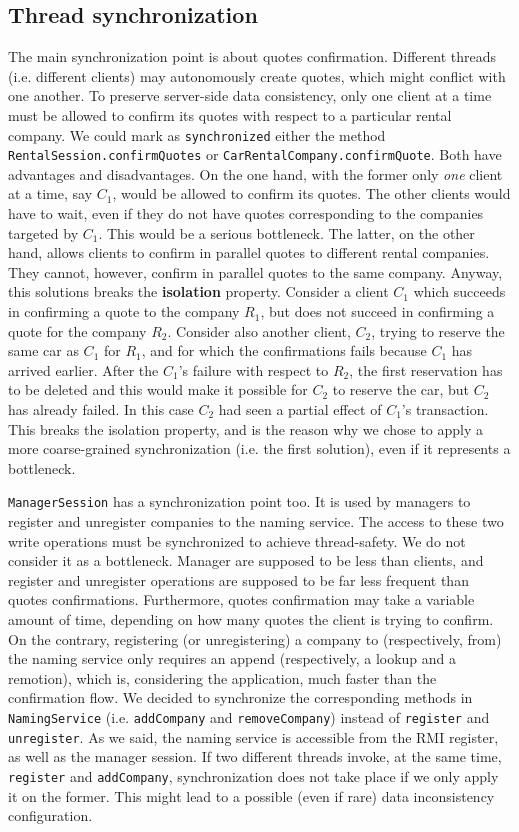 \subsection{Thread synchronization}
The main synchronization point is about quotes confirmation. Different threads (i.e. different clients) may autonomously create quotes, which might conflict with one another. To preserve server-side data consistency, only one client at a time must be allowed to confirm its quotes with respect to a particular rental company. We could mark as \texttt{synchronized} either the method \texttt{RentalSession.confirmQuotes} or \texttt{CarRentalCompany.confirmQuote}. Both have advantages and disadvantages. On the one hand, with the former only \textit{one} client at a time, say $C_1$, would be allowed to confirm its quotes. The other clients would have to wait, even if they do not have quotes corresponding to the companies targeted by $C_1$. This would be a serious bottleneck. The latter, on the other hand, allows clients to confirm in parallel quotes to different rental companies. They cannot, however, confirm in parallel quotes to the same company. Anyway, this solutions breaks the \textbf{isolation} property. Consider a client $C_1$ which succeeds in confirming a quote to the company $R_1$, but does not succeed in confirming a quote for the company $R_2$. Consider also another client, $C_2$, trying to reserve the same car as $C_1$ for $R_1$, and for which the confirmations fails because $C_1$ has arrived earlier. After the $C_1$'s failure with respect to $R_2$, the first reservation has to be deleted and this would make it possible for $C_2$ to reserve the car, but $C_2$ has already failed. In this case $C_2$ had seen a partial effect of $C_1$'s transaction. This breaks the isolation property, and is the reason why we chose to apply a more coarse-grained synchronization (i.e. the first solution), even if it represents a bottleneck.

\texttt{ManagerSession} has a synchronization point too. It is used by managers to register and unregister companies to the naming service. The access to these two write operations must be synchronized to achieve thread-safety. We do not consider it as a bottleneck. Manager are supposed to be less than clients, and register and unregister operations are supposed to be far less frequent than quotes confirmations. Furthermore, quotes confirmation may take a variable amount of time, depending on how many quotes the client is trying to confirm. On the contrary, registering (or unregistering) a company to (respectively, from) the naming service only requires an append (respectively, a lookup and a remotion), which is, considering the application, much faster than the confirmation flow. We decided to synchronize the corresponding methods in \texttt{NamingService} (i.e. \texttt{addCompany} and \texttt{removeCompany}) instead of \texttt{register} and \texttt{unregister}. As we said, the naming service is accessible from the RMI register, as well as the manager session. If two different threads invoke, at the same time, \texttt{register} and \texttt{addCompany}, synchronization does not take place if we only apply it on the former. This might lead to a possible (even if rare) data inconsistency configuration. 

